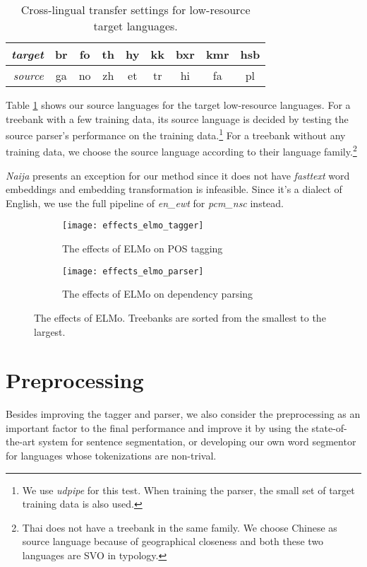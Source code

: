 \documentclass[11pt,a4paper]{article}
\begin{document}
\begin{table}[t]
	\centering
	\small
	\begin{tabular}{r|cccccccc}
		\textit{target} & br & fo & th &hy & kk & bxr & kmr & hsb \\
		\hline
		\textit{source} & ga & no & zh & et & tr &  hi & fa & pl \\
	\end{tabular}
	\caption{Cross-lingual transfer settings for low-resource target languages.}\label{tbl:low-res-trans}
\end{table}
Table \ref{tbl:low-res-trans} shows our source languages for the target low-resource languages.
For a treebank with a few training data, its  source language is decided by
testing the source parser's performance on the training data.\footnote{We use \textit{udpipe} for this test.
	When training the parser, the small set of target training data is also used.}
For a treebank without any training data, we choose the source language according to their language family.\footnote{Thai
	does not have a treebank in the same family. We choose Chinese as source language because of geographical closeness
	and both these two languages are SVO in typology.}

\textit{Naija} presents an exception for our method since it does not have \textit{fasttext}
word embeddings and embedding transformation is infeasible.
Since it's a dialect of English, we use the full pipeline of \textit{en\_ewt} for \textit{pcm\_nsc} instead.
\begin{figure*}[t]
	\begin{subfigure}{\textwidth}
	\texttt{[image: effects\_elmo\_tagger]}
	\caption{The effects of ELMo on POS tagging}\label{fig:elmo-effect:pos}
	\end{subfigure}
	\begin{subfigure}{\textwidth}
	\texttt{[image: effects\_elmo\_parser]}
	\caption{The effects of ELMo on dependency parsing}\label{fig:elmo-effect:par}
	\end{subfigure}
	\caption{The effects of ELMo.
		Treebanks are sorted from the smallest to the largest.}\label{fig:elmo-effect}
\end{figure*}

\section{Preprocessing}
Besides improving the tagger and parser,
we also consider the preprocessing as an important factor to
the final performance and improve it
by using the state-of-the-art system for sentence segmentation,
or developing our own word segmentor for languages
whose tokenizations are non-trival.
\end{document}
